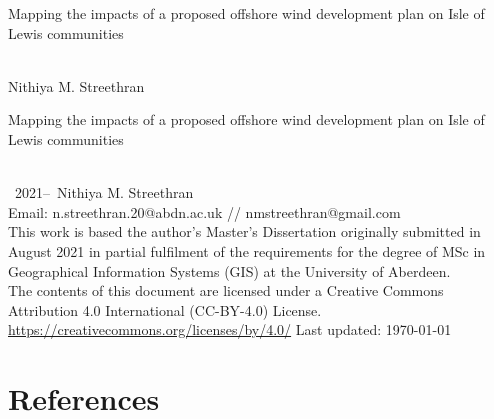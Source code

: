 \documentclass[twoside,12pt,openany]{book}
\def\theauthor{Nithiya M. Streethran}
\def\thetitle{%
  Mapping the impacts of a proposed offshore wind development plan on
  Isle of Lewis communities%
}
\begin{document}

\frontmatter

\begin{titlepage}
  \hspace{0pt}\vfill %
  \centering %
  \Large\thetitle
  \\[4cm]
  \large\theauthor
  \vfill\hspace{0pt} %
\end{titlepage}

{%
  \setlength{\parindent}{0pt}
  \hspace{0pt}\vfill
  \thetitle
  \\[.5cm]
  \textcopyright~2021--\the\year{}~\theauthor
  \\[.5cm]
  Email: n.streethran.20@abdn.ac.uk // nmstreethran@gmail.com
  \\[.5cm]
  This work is based the author's Master's Dissertation originally
  submitted in August 2021 in partial fulfilment of the requirements for the
  degree of MSc in Geographical Information Systems (GIS) at the University of
  Aberdeen.
  \\[.5cm]
  The contents of this document are licensed under a Creative Commons
  Attribution 4.0 International (CC-BY-4.0) License. \\
  \url{https://creativecommons.org/licenses/by/4.0/}
  \vfill
  Last updated: \today
  \vfill\hspace{0pt}
}

\doublespacing



\tableofcontents
\listoffigures
\listoftables
\printglossaries



\themainmatter








{%
  \backmatter%
  \chapter{References}%
  \printbibliography[category=cited,heading=none]%
}

\nocite{*}
\theappendix


\end{document}
